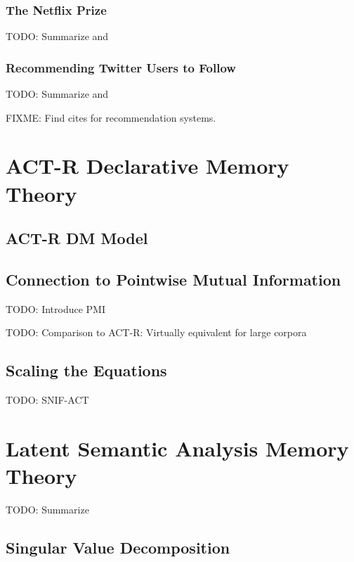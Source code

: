 \documentclass[man]{apa6}
\begin{document}
\subsubsection{The Netflix Prize}

TODO: Summarize and \cite{Bennett2007}

\subsubsection{Recommending Twitter Users to Follow}

TODO: Summarize and \cite{Hannon2010}

FIXME: Find cites for recommendation systems.

\section{ACT-R Declarative Memory Theory}

\cite{Anderson2004}

\subsection{ACT-R DM Model}

\subsection{Connection to Pointwise Mutual Information}

TODO: Introduce PMI \cite{Farahat2004}

TODO: Comparison to ACT-R: Virtually equivalent for large corpora \cite{Farahat2004}

\subsection{Scaling the Equations}

\cite{Douglass2010}

TODO: SNIF-ACT \cite{Fu2007} \cite{Pirolli2003}

\section{Latent Semantic Analysis Memory Theory}

TODO: Summarize \cite{Landauer1997}

\subsection{Singular Value Decomposition}
\end{document}

